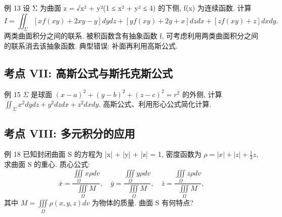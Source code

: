 例 13
设 Σ 为曲面 z = √x² + y²(1 ≤ x² + y² ≤ 4) 的下侧, f(x) 为连续函数. 计算
\[I = \iint_{\Sigma} [xf(xy) + 2xy - y] dy dz + [yf(xy) + 2y + x] dz dx + [zf(xy) + z] dx dy.\]
两类曲面积分之间的联系.
被积函数含有抽象函数 f, 可考虑利用两类曲面积分之间的联系消去该抽象函数.
典型错误: 补面再利用高斯公式.


\subsection*{考点 VII: 高斯公式与斯托克斯公式}

例 15
\(\Sigma\) 是球面 \((x-a)^2 + (y-b)^2 + (z-c)^2 = r^2\) 的外侧, 计算 \(\iint_{\Sigma} x^2 dy dz + y^2 dz dx + z^2 dx dy.\)
高斯公式、利用形心公式简化计算.


\subsection*{考点 VIII: 多元积分的应用}

例 18
已知封闭曲面 S 的方程为 |x| + |y| + |z| = 1, 密度函数为 \(\rho = |x| + |z| + \frac{1}{3}z\), 求曲面 S 的重心.
质心公式:
\[ \bar{x} = \frac{\iiint\limits_{\Omega} x \rho dv}{\iiint\limits_{\Omega} M}, \quad \bar{y} = \frac{\iiint\limits_{\Omega} y \rho dv}{\iiint\limits_{\Omega} M}, \quad \bar{z} = \frac{\iiint\limits_{\Omega} z \rho dv}{\iiint\limits_{\Omega} M}, \]
其中 \(M = \iiint\limits_{\Omega} \rho(x, y, z) dv\) 为物体的质量.
曲面 S 有何特点?


